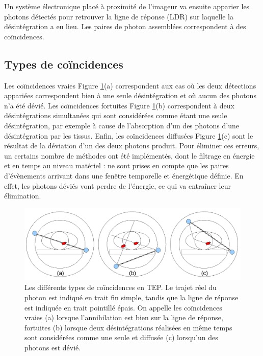 Un système électronique placé à proximité de l'imageur va ensuite apparier les photons détectés pour retrouver la ligne de réponse (LDR) sur laquelle la désintégration a eu lieu. Les paires de photon assemblées correspondent à des coïncidences.

	\subsection{Types de coïncidences}

Les coïncidences vraies Figure \ref{fig:schemaDetections}(a) correspondent aux cas où les deux détections appariées correspondent bien à une seule désintégration et où aucun des photons n'a été dévié. Les coïncidences fortuites Figure \ref{fig:schemaDetections}(b) correspondent à deux désintégrations simultanées qui sont considérées comme étant une seule désintégration, par exemple à cause de l’absorption d’un des photons d’une désintégration par les tissus. Enfin, les coïncidences diffusées Figure \ref{fig:schemaDetections}(c) sont le résultat de la déviation d'un des deux photons produit. Pour éliminer ces erreurs, un certains nombre de méthodes ont été implémentés, dont le filtrage en énergie et en temps au niveau matériel : ne sont prises en compte que les paires d'évènements arrivant dans une fenêtre temporelle et énergétique définie. En effet, les photons déviés vont perdre de l'énergie, ce qui va entraîner leur élimination.

\begin{figure}
\centering
\includegraphics[width=12cm]{images/schemaDetections}
\caption[Les différents types de coïncidences en TEP]{Les différents types de coïncidences en TEP. Le trajet réel du photon est indiqué en trait fin simple, tandis que la ligne de réponse est indiquée en trait pointillé épais. On appelle les coïncidences vraies (a) lorsque l'annihilation est bien sur la ligne de réponse, fortuites (b) lorsque deux désintégrations réalisées en même temps sont considérées comme une seule et diffusée (c) lorsqu'un des photons est dévié.}
\label{fig:schemaDetections}
\end{figure}



